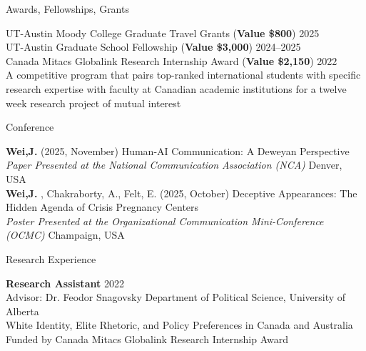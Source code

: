\documentclass[
	11pt, %
]{resume} %
\begin{document}
\begin{rSection}{Awards, Fellowships, Grants}
	
	UT-Austin Moody College Graduate Travel Grants (\textbf{Value \$800})  \hfill 2025\\
	UT-Austin Graduate School Fellowship   (\textbf{Value \$3,000})  \hfill 2024--2025\\
    Canada Mitacs Globalink Research Internship Award     (\textbf{Value \$2,150})  \hfill 2022\\
\textbullet\enspace  A competitive program that pairs top-ranked international students with specific research expertise with faculty at Canadian academic institutions for a twelve week research project of mutual interest\\
	
\end{rSection}


\begin{rSection}{Conference}
	
	\textbf{Wei,J.} (2025, November) Human-AI Communication: A Deweyan Perspective\\
	\textit{Paper Presented at the National Communication Association (NCA)} \hfill Denver, USA \\

	\textbf{Wei,J.} , Chakraborty, A., Felt, E. (2025, October) Deceptive Appearances: The Hidden Agenda of Crisis Pregnancy Centers \\
	\textit{Poster Presented at the Organizational Communication Mini-Conference (OCMC)} \hfill Champaign, USA \\
	
\end{rSection}


\begin{rSection}{Research Experience}
	
	\textbf{Research Assistant} \hfill 2022\\
    {Advisor:} Dr. Feodor Snagovsky \hfill Department of Political Science, University of Alberta \\
\textbullet{} White Identity, Elite Rhetoric, and Policy Preferences in Canada and Australia\\
\textbullet\enspace Funded by Canada Mitacs Globalink Research Internship Award\\

	
\end{rSection}
\end{document}
